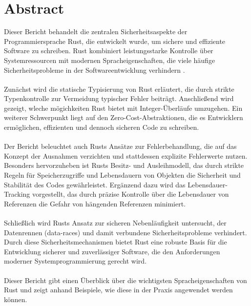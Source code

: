 \section*{Abstract}
\label{sec:abstract}


Dieser Bericht behandelt die zentralen Sicherheitsaspekte der Programmiersprache Rust, die entwickelt wurde, um sichere und effiziente Software zu schreiben. 
Rust kombiniert leistungsstarke Kontrolle über Systemressourcen mit modernen Spracheigenschaften, die viele häufige Sicherheitsprobleme in der Softwareentwicklung verhindern \cite{RustDoc2024}.\\
\\
Zunächst wird die statische Typisierung von Rust erläutert, die durch strikte Typenkontrolle zur Vermeidung typischer Fehler beiträgt. 
Anschließend wird gezeigt, wleche mögichkeiten Rust bietet mit Integer-Überläufe umzugehen. 
Ein weiterer Schwerpunkt liegt auf den Zero-Cost-Abstraktionen, die es Entwicklern ermöglichen, effizienten und dennoch sicheren Code zu schreiben.\\
\\
Der Bericht beleuchtet auch Rusts Ansätze zur Fehlerbehandlung, die auf das Konzept der Ausnahmen verzichten und stattdessen explizite Fehlerwerte nutzen. 
Besonders hervorzuheben ist Rusts Besitz- und Ausleihmodell, das durch strikte Regeln für Speicherzugriffe und Lebensdauern von Objekten die Sicherheit und Stabilität des Codes gewährleistet. 
Ergänzend dazu wird das Lebensdauer-Tracking vorgestellt, das durch präzise Kontrolle über die Lebensdauer von Referenzen die Gefahr von hängenden Referenzen minimiert.\\
\\
Schließlich wird Rusts Ansatz zur sicheren Nebenläufigkeit untersucht, der Datenrennen (\glspl{data-race}) und damit verbundene Sicherheitsprobleme verhindert. 
Durch diese Sicherheitsmechanismen bietet Rust eine robuste Basis für die Entwicklung sicherer und zuverlässiger Software, die den Anforderungen moderner Systemprogrammierung gerecht wird.\\
\\
Dieser Bericht gibt einen Überblick über die wichtigsten Spracheigenschaften von Rust und zeigt anhand Beispiele, wie diese in der Praxis angewendet werden können.
